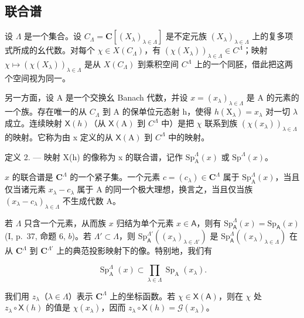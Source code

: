 \subsection{联合谱}

设 \(\Lambda\) 是一个集合。设 \(C_{\Lambda} = \mathbf{C}[(X_{\lambda})_{\lambda \in \Lambda}]\) 是不定元族 \((X_{\lambda})_{\lambda \in \Lambda}\) 上的复多项式所成的幺代数。对每个 \(\chi \in X(C_{\Lambda})\)，有 \((\chi (X_{\lambda}))_{\lambda \in \Lambda} \in C^{\Lambda}\)；映射 \(\chi \mapsto (\chi (X_{\lambda}))_{\lambda \in \Lambda}\) 是从 \(X(C_{\Lambda})\) 到乘积空间 \(C^{\Lambda}\) 上的一个同胚，借此把这两个空间视为同一。

另一方面，设 A 是一个交换幺 Banach 代数，并设 \(x = (x_{\lambda})_{\lambda \in \Lambda}\) 是 A 的元素的一个族。存在唯一的从 \(C_{\Lambda}\) 到 A 的保单位元态射 h，使得 \(h(\mathrm{X}_{\lambda}) = x_{\lambda}\) 对一切 \(\lambda\) 成立。连续映射 \(\mathsf{X}(h)\)（从 \(\mathsf{X}(\mathrm{A})\) 到 \(C^{\Lambda}\) 中）是把 \(\chi\) 联系到族 \((\chi(x_{\lambda}))_{\lambda \in \Lambda}\) 的映射。它称为由 x 定义的从 \(\mathsf{X}(\mathrm{A})\) 到 \(C^{\Lambda}\) 中的映射。

定义 2. --- 映射 X(h) 的像称为 x 的联合谱，记作 \(\mathrm{Sp}_{\mathrm{A}}^{\Lambda}(x)\) 或 \(\mathrm{Sp}^{\Lambda}(x)\)。

\(x\) 的联合谱是 \(\mathbf{C}^{\Lambda}\) 的一个紧子集。一个元素 \(c = (c_{\lambda}) \in \mathbf{C}^{\Lambda}\) 属于 \(\mathrm{Sp}_{\mathrm{A}}^{\Lambda}(x)\)，当且仅当诸元素 \(x_{\lambda} - c_{\lambda}\) 属于 \(\mathrm{A}\) 的同一个极大理想，换言之，当且仅当族 \((x_{\lambda} - c_{\lambda})_{\lambda \in \Lambda}\) 不生成代数 \(\mathrm{A}\)。

若 \(\Lambda\) 只含一个元素，从而族 \(x\) 归结为单个元素 \(x \in \mathsf{A}\)，则有 \(\mathrm{Sp}_{\mathsf{A}}^{\Lambda}(x) = \mathrm{Sp}_{\mathsf{A}}(x)\) (I, p.~37, 命题 6, \(b\))。若 \(\Lambda' \subset \Lambda\)，则 \(\mathrm{Sp}_{\mathsf{A}}^{\Lambda'}((x_{\lambda})_{\lambda \in \Lambda'})\) 是 \(\mathrm{Sp}_{\mathsf{A}}^{\Lambda}((x_{\lambda})_{\lambda \in \Lambda})\) 在从 \(\mathbf{C}^{\Lambda}\) 到 \(\mathbf{C}^{\Lambda'}\) 上的典范投影映射下的像。特别地，我们有

\[
\operatorname{Sp} _ {\mathrm{A}} ^ {\Lambda} (x) \subset \prod_ {\lambda \in \Lambda} \operatorname{Sp} _ {\mathrm{A}} (x _ {\lambda}).
\]

我们用 \(z_{\lambda}\)（\(\lambda \in \Lambda\)）表示 \(\mathbf{C}^{\Lambda}\) 上的坐标函数。若 \(\chi \in \mathsf{X}(\mathsf{A})\)，则在 \(\chi\) 处 \(z_{\lambda} \circ \mathsf{X}(h)\) 的值是 \(\chi(x_{\lambda})\)，因而 \(z_{\lambda} \circ \mathsf{X}(h) = \mathcal{G}(x_{\lambda})\)。

